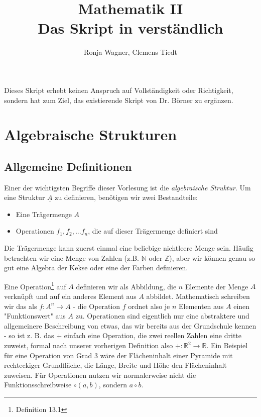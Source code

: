 \documentclass{scrartcl}
\author{Ronja Wagner, Clemens Tiedt}
\title{Mathematik II \\ Das Skript in verständlich}
\begin{document}
\maketitle
\pagebreak

Dieses Skript erhebt keinen Anspruch auf Vollständigkeit oder Richtigkeit, sondern hat zum Ziel, das existierende Skript von Dr. Börner zu ergänzen.
\pagebreak

\tableofcontents
\pagebreak

\section{Algebraische Strukturen}

\subsection{Allgemeine Definitionen}

Einer der wichtigsten Begriffe dieser Vorlesung ist die \emph{algebraische Struktur}. Um eine Struktur $\underline{A}$ zu definieren, benötigen wir zwei Bestandteile:

\begin{itemize}
    \item Eine Trägermenge $A$
    \item Operationen $f_1, f_2, ... f_n$, die auf dieser Trägermenge definiert sind
\end{itemize}

Die Trägermenge kann zuerst einmal eine beliebige nichtleere Menge sein. Häufig betrachten wir eine Menge von Zahlen (z.B. $\mathbb{N}$ oder $\mathbb{Z}$),
aber wir können genau so gut eine Algebra der Kekse oder eine der Farben definieren. 

Eine Operation\footnote{Definition 13.1} auf $A$ definieren wir als Abbildung, die $n$ Elemente der Menge $A$ verknüpft und auf ein anderes Element aus $A$ abbildet. Mathematisch schreiben wir das als $f: A^n \to A$
- die Operation $f$ ordnet also je $n$ Elementen aus $A$ einen "Funktionswert" aus $A$ zu.
Operationen sind eigentlich nur eine abstraktere und allgemeinere Beschreibung von etwas, das wir bereits aus der Grundschule kennen - so ist z. B. das + einfach eine Operation, die zwei reellen Zahlen eine dritte zuweist, formal nach unserer vorherigen Definition also $+: \mathbb{R}^2 \to \mathbb{R}$. Ein Beispiel für eine Operation von Grad 3 wäre der Flächeninhalt einer Pyramide mit rechteckiger Grundfläche, die Länge, Breite und Höhe den Flächeninhalt zuweisen.
Für Operationen nutzen wir normalerweise nicht die Funktionsschreibweise $\circ(a, b)$, sondern $a \circ b$.
\end{document}
